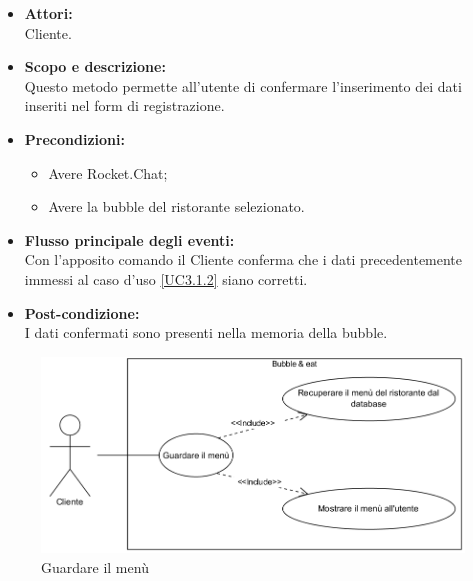 
\begin{itemize}
	\item \textbf{Attori:}
	\\Cliente.
	\item \textbf{Scopo e descrizione:} 
	\\Questo metodo permette all'utente di confermare l'inserimento dei dati inseriti nel form di registrazione.
	\item \textbf{Precondizioni:}
	\begin{itemize}
		\item Avere Rocket.Chat;
		\item Avere la bubble del ristorante selezionato.
	\end{itemize}
	\item \textbf{Flusso principale degli eventi:}
	\\Con l'apposito comando il Cliente conferma che i dati precedentemente immessi al caso d'uso \ref{UC3.1.2} siano corretti.
	\item \textbf{Post-condizione:}
	\\I dati confermati sono presenti nella memoria della bubble.
\end{itemize}


\begin{figure}[H]
	\centering
	\includegraphics[width=15cm]{../../documenti/AnalisiDeiRequisiti/Diagrammi_img/uc3_2.png}
	\caption{\UCCaption{} Guardare il menù}
\end{figure}

